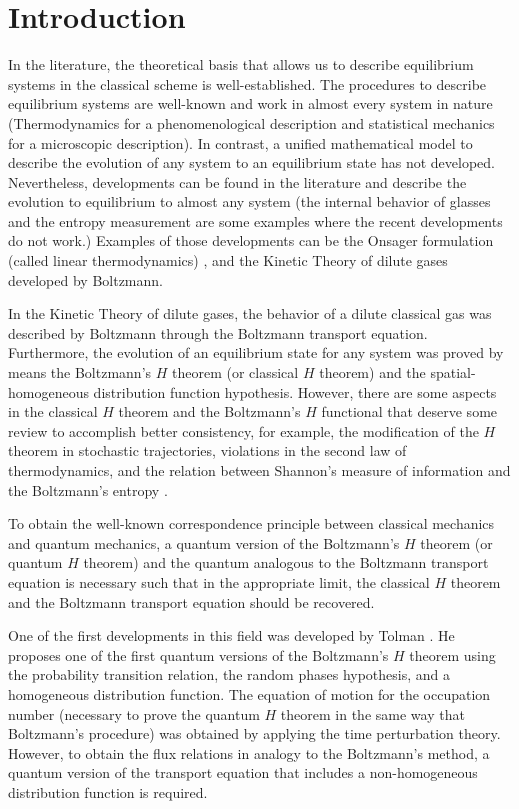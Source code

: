 \section{Introduction}

In the literature, the theoretical basis that allows us to describe equilibrium
systems in the classical scheme is well-established.
The procedures to describe
equilibrium systems are well-known and work in almost every system in nature
(Thermodynamics for a phenomenological description and statistical mechanics
for a microscopic description). In contrast, a unified mathematical model to
describe the evolution of any system to an equilibrium state has not developed.
Nevertheless, developments can be found in the literature and describe the
evolution to equilibrium to almost any system (the internal behavior of glasses
\cite{bib:zanotto2018} and the entropy measurement
\cite{bib:schmelzer2018,bib:nemilov2018} are some examples where the recent
developments do not work.) Examples of those developments can be the Onsager
formulation (called linear thermodynamics)
\cite{bib:keizer1987,bib:onsager1931}, and the Kinetic Theory of dilute gases
developed by Boltzmann.

In the Kinetic Theory of dilute gases, the behavior of a dilute classical gas
was described by Boltzmann through the Boltzmann transport equation.
Furthermore, the evolution of an equilibrium state for any system was proved by
means the Boltzmann's $H$ theorem (or classical $H$ theorem) and the
spatial-homogeneous distribution function hypothesis.
However, there are some aspects in the classical $H$ theorem and the
Boltzmann's $H$ functional that deserve some review to accomplish better
consistency, for example, the modification of the $H$ theorem in stochastic
trajectories, violations in the second law of thermodynamics, and the relation
between Shannon's measure of information and the Boltzmann's entropy %
\cite{bib:nemilov2018,bib:keizer1987,bib:onsager1931,bib:brown2008,bib:dragoljub2009}.

To obtain the well-known correspondence principle between classical mechanics
and quantum mechanics, a quantum version of the Boltzmann's $H$ theorem (or
quantum $H$ theorem) and the quantum analogous to the Boltzmann transport
equation is necessary such that in the appropriate limit, the  classical $H$
theorem and the Boltzmann transport equation should be recovered.

One of the first developments in this field was developed by Tolman
\cite{bib:tolman}. He proposes one of the first quantum versions of the
Boltzmann's $H$ theorem using the probability transition relation, the random
phases hypothesis, and a homogeneous distribution function. The equation of
motion for the occupation number (necessary to prove the quantum $H$ theorem in
the same way that Boltzmann's procedure) was obtained by applying the time
perturbation theory. However, to obtain the flux relations in analogy to the
Boltzmann's method, a quantum version of the transport equation that includes a
non-homogeneous distribution function is required.

